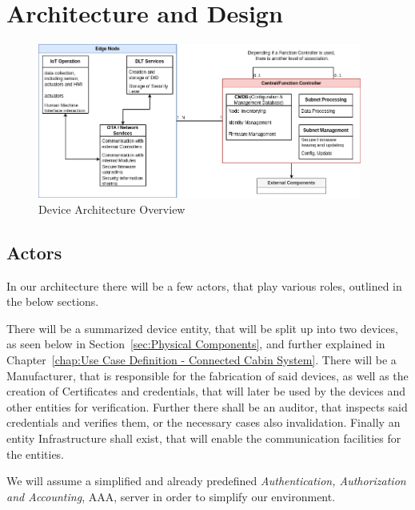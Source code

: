 \chapter{Architecture and Design}
\label{chap:Architecture and Design}

\begin{figure}
	\begin{center}
		\includegraphics[width=0.95\textwidth]{figures/device-architecture-overview.png}
	\end{center}
	\caption{Device Architecture Overview}
	\label{fig:device-architecture-overview}
\end{figure}

\section{Actors} %
\label{sec:Actors-design}
In our architecture there will be a few actors, that play various roles, outlined in the below sections.

There will be a summarized device entity, that will be split up into two devices, as seen below in
Section~\ref{sec:Physical Components}, and further explained in Chapter~\ref{chap:Use Case Definition - Connected Cabin System}.
There will be a Manufacturer, that is responsible for the fabrication of said devices, as well as the creation of
Certificates and credentials, that will later be used by the devices and other entities for verification.
Further there shall be an auditor, that inspects said credentials and verifies them, or the necessary cases also
invalidation.
Finally an entity Infrastructure shall exist, that will enable the communication facilities for the entities.

We will assume a simplified and already predefined \textit{Authentication, Authorization and Accounting}, AAA, server
in order to simplify our environment.

